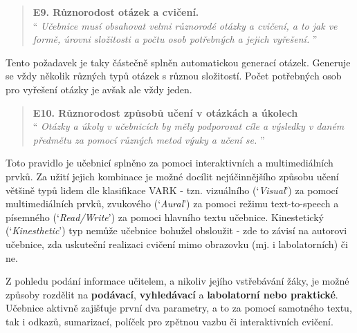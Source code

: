 \documentclass[12pt]{article}
\begin{document}
\filbreak

\begin{samepage}
	\begin{quotation}
		\textbf{E9. Různorodost otázek a cvičení.} \\
		\enquote{\textit{
				Učebnice musí obsahovat velmi různorodé otázky a cvičení, a to jak ve formě, úrovni složitosti a počtu osob potřebných a jejich vyřešení.
		}}
	\end{quotation}

	Tento požadavek je taky částečně splněn automatickou generací otázek. Generuje se vždy několik různých typů otázek s různou složitostí. Počet potřebných osob pro vyřešení otázky je avšak ale vždy jeden.
\end{samepage}

\filbreak

\begin{samepage}
	\begin{quotation}
		\textbf{E10. Různorodost způsobů učení v otázkách a úkolech} \\
		\enquote{\textit{
				Otázky a úkoly v učebnicích by měly podporovat cíle a výsledky v daném předmětu za pomocí různých metod výuky a učení se.
		}}
	\end{quotation}

	Toto pravidlo je učebnicí splněno za pomoci interaktivních a multimediálních prvků.  Za užití jejich kombinace je možné docílit nejúčinnějšího způsobu učení většině typů lidem dle klasifikace VARK \cite{VARK} - tzn. vizuálního  (\enquote*{\textit{Visual}}) za pomocí multimediálních prvků, zvukového (\enquote*{\textit{Aural}}) za pomoci režimu text-to-speech a písemného (\enquote*{\textit{Read/Write}}) za pomoci hlavního textu učebnice. Kinestetický  (\enquote*{\textit{Kinesthetic}}) typ nemůže učebnice bohužel obsloužit - zde to závisí na autorovi učebnice, zda uskuteční realizaci cvičení mimo obrazovku (mj. i labolatorních) či ne.

	Z pohledu podání informace učitelem, a nikoliv jejího vstřebávání žáky, je možné způsoby rozdělit na \textbf{podávací}, \textbf{vyhledávací} a \textbf{labolatorní nebo praktické}. Učebnice aktivně zajišťuje první dva parametry, a to za pomocí samotného textu, tak i odkazů, sumarizací, políček pro zpětnou vazbu či interaktivních cvičení. \cite[s. 137]{PDO}
\end{samepage}

\filbreak
\end{document}
